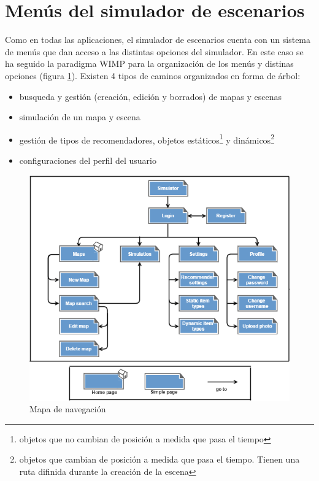 \section{Menús del simulador de escenarios}


Como en todas las aplicaciones, el simulador de escenarios cuenta con un sistema de menús que dan acceso a las distintas opciones del simulador. En este caso se ha seguido la paradigma WIMP para la organización de los menús y distinas opciones (figura \ref{mapaNavegacion}). Existen 4 tipos de caminos organizados en forma de árbol:

\begin{itemize}
	\item busqueda y gestión (creación, edición y borrados) de mapas y escenas
	\item simulación de un mapa y escena
	\item gestión de tipos de recomendadores, objetos estáticos\footnote{objetos que no cambian de posición a medida que pasa el tiempo} y dinámicos\footnote{objetos que cambian de posición a medida que pasa el tiempo. Tienen una ruta difinida durante la creación de la escena}
	\item configuraciones del perfil del usuario
\end{itemize} 

\begin{figure}[H]
\centering\includegraphics[scale=0.7]{imagenes/mapa-navegacion.png}
\caption{Mapa de navegación}
\label{mapaNavegacion}
\end{figure}

